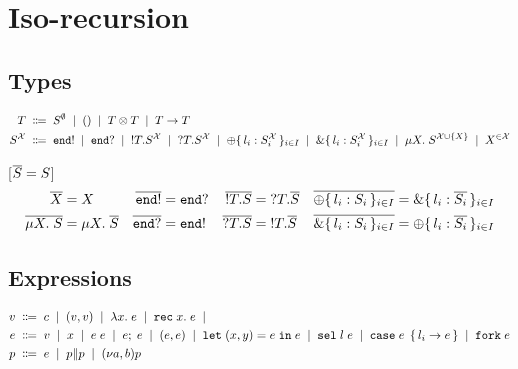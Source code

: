 \section{Iso-recursion}

\subsection{Types}

\begin{align*}
  T \grmdef&
    S^\emptyset               \grmor
    \TUnit          \grmor
    \TPair T T      \grmor
    \TFun  T T      \\
  S^{\mathcal X} \grmdef&
    \TEnd !         \grmor
    \TEnd ?         \grmor
    \TOut T S^{\mathcal X}       \grmor
    \TIn  T S^{\mathcal X}       \grmor
    \TSelect{ l_i: S^{\mathcal X}_i } \grmor
    \TCase{ l_i: S^{\mathcal X}_i }   \grmor
    \TRec[X] S^{\mathcal X \cup \{X\}}      \grmor
    X^{\in \mathcal X}
\end{align*}

[$\TDual S = S$]
\begin{align*}
  \TDual X &= X                               &
  \TDual{\TEnd !} &= \TEnd ?                  &
  \TDual{\TOut T S} &= \TIn T \TDual{S}       &
  \TDual{\TSelect{ l_i: S_i }} &=
    \TCase{ l_i: \TDual{S_i} }                \\
  \TDual{\TRec S} &= \TRec{\TDual S}          &
  \TDual{\TEnd ?} &= \TEnd !                  &
  \TDual{\TIn T S} &= \TOut T \TDual{S}       &
  \TDual{\TCase{ l_i: S_i }} &=
    \TSelect{ l_i: \TDual{S_i} }
\end{align*}

% 


\subsection{Expressions}

\begin{align*}
  v \grmdef&
    c                        \grmor
    (v, v)                   \grmor
    \ELam x e                \grmor
    \ERec x e                \grmor
  \\
  e \grmdef&
    v                       \grmor
    x                       \grmor
    e \; e                  \grmor
    \ELetU e e              \grmor
    (e, e)                  \grmor
    \ELetP x y e e          \grmor
    \ESelect l e            \grmor
    \ECase e { l_i \rightarrow e } \grmor
    \EFork e
  \\
  p \grmdef&
    e                       \grmor
    \PPar p p               \grmor
    \PScope p
\end{align*}

